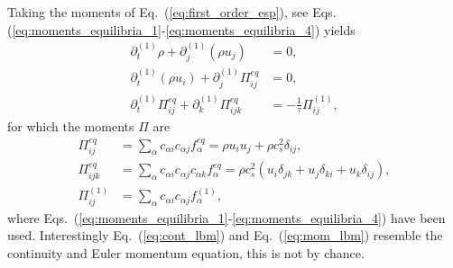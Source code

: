 Taking the moments of Eq.~(\ref{eq:first_order_esp}), see Eqs.(\ref{eq:moments_equilibria_1}-\ref{eq:moments_equilibria_4}) yields
\begin{align}
    \partial_t^{(1)}\rho + \partial_j^{(1)}(\rho u_j) &= 0, \label{eq:cont_lbm}\\
    \partial_t^{(1)}(\rho u_i) + \partial_j^{(1)}\Pi^{eq}_{ij} &= 0, \label{eq:mom_lbm}\\
    \partial_t^{(1)}\Pi^{eq}_{ij} + \partial_k^{(1)}\Pi^{eq}_{ijk} &= -\frac{1}{\tau}\Pi^{(1)}_{ij}, \label{eq:energy_lbm}
\end{align}
for which the moments $\Pi$ are
\begin{align}
    \Pi^{eq}_{ij} &= \sum_{\alpha}c_{\alpha i} c_{\alpha j} f_{\alpha}^{eq} = \rho u_i u_j + \rho c_s^2\delta_{i j}, \label{eq:Pi_lbm_1}\\
    \Pi^{eq}_{ijk} &= \sum_{\alpha}c_{\alpha i} c_{\alpha j} c_{\alpha k} f_{\alpha}^{eq} = \rho c_s^2(u_i\delta_{j k} + u_j\delta_{k i} + u_k\delta_{i j}), \label{eq:Pi_lbm_2}\\
    \Pi^{(1)}_{ij} &= \sum_{\alpha}c_{\alpha i} c_{\alpha j} f_{\alpha}^{(1)}, \label{eq:Pi_lbm_3}
\end{align}
where Eqs.~(\ref{eq:moments_equilibria_1}-\ref{eq:moments_equilibria_4}) have been used.
Interestingly Eq.~(\ref{eq:cont_lbm}) and Eq.~(\ref{eq:mom_lbm}) resemble the continuity and Euler momentum equation, this is not by chance.

